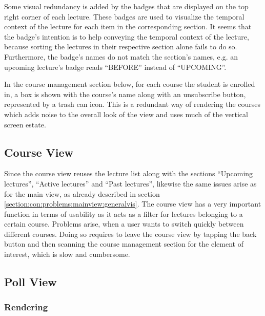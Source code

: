 Some visual redundancy is added by the badges that are displayed on the top right corner of each lecture. These badges are used to visualize the temporal context of the lecture for each item in the corresponding section. It seems that the badge's intention is to help conveying the temporal context of the lecture, because sorting the lectures in their respective section alone fails to do so. Furthermore, the badge's names do not match the section's names, e.g. an upcoming lecture's badge reads “BEFORE” instead of “UPCOMING”. 

In the course management section below, for each course the student is enrolled in, a box is shown with the course's name along with an unsubscribe button, represented by a trash can icon.
\todogrf
This is a redundant way of rendering the courses which adds noise to the overall look of the view and uses much of the vertical screen estate.

\subsection{Course View}

Since the course view reuses the lecture list along with the sections “Upcoming lectures”, “Active lectures” and “Past lectures”, likewise the same issues arise as for the main view, as already described in section \ref{section:con:problems:mainview:generalvis}. 
The course view has a very important function in terms of usability as it acts as a filter for lectures belonging to a certain course. Problems arise, when a user wants to switch quickly between different courses. Doing so requires to leave the course view by tapping the back button and then scanning the course management section for the element of interest, which is slow and cumbersome.

\todogrf

\subsection{Poll View}

\subsubsection{Rendering}

